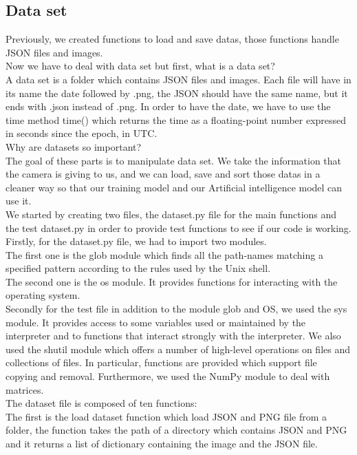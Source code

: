 \documentclass[12pt]{article}
\begin{document}
\subsection{Data set}
Previously, we created functions to load and save datas, those functions handle JSON files and images. \\ 
Now we have to deal with data set but first, what is a data set? \\  
A data set is a folder which contains JSON files and images. Each file will have in its name the date followed by .png, the JSON should have the same name, but it ends with .json instead of .png. In order to have the date, we have to use the time method time() which returns the time as a floating-point number expressed in seconds since the epoch, in UTC.\\ 
Why are datasets so important? \\  
The goal of these parts is to manipulate data set. We take the information that the camera is giving to us, and we can load, save and sort those datas in a cleaner way so that our training model and our Artificial intelligence model can use it.\\ 
We started by creating two files, the dataset.py file for the main functions and the test dataset.py in order to provide test functions to see if our code is working.\\ 
Firstly, for the dataset.py file, we had to import two modules. \\ 
The first one is the glob module which finds all the path-names matching a specified pattern according to the rules used by the Unix shell.\\
The second one is the os module. It provides functions for interacting with the operating system.\\ 
Secondly for the test file in addition to the module glob and OS, we used the sys module. It provides access to some variables used or maintained by the interpreter and to functions that interact strongly with the interpreter. 
We also used the shutil module which offers a number of high-level operations on files and collections of files. In particular, functions are provided which support file copying and removal. Furthermore, we used the NumPy module to deal with matrices.\\ 
The dataset file is composed of ten functions:\\  
The first is the load dataset function which load JSON and PNG file from a folder, the function takes the path of a directory which contains JSON and PNG and it returns a list of dictionary containing the image and the JSON file.\\ 
\end{document}
